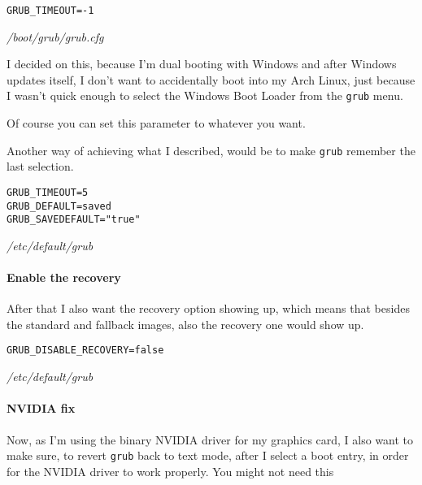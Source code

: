 \documentclass[10pt]{dustdoc}
\begin{document}
\begin{mintedlisting}
    \begin{verbatim}
GRUB_TIMEOUT=-1
    \end{verbatim}

    \caption{\textit{/boot/grub/grub.cfg}}
\end{mintedlisting}

\begin{NOTE}
    I decided on this, because I’m dual booting with Windows and after Windows updates itself, I don’t want to accidentally boot into my Arch Linux, just because I wasn’t quick enough to select the Windows Boot Loader from the \texttt{grub} menu.

    Of course you can set this parameter to whatever you want.

    Another way of achieving what I described, would be to make \texttt{grub} remember the last selection.

    \begin{mintedlisting}
        \begin{verbatim}
GRUB_TIMEOUT=5
GRUB_DEFAULT=saved
GRUB_SAVEDEFAULT="true"
        \end{verbatim}

        \caption{\textit{/etc/default/grub}}
    \end{mintedlisting}
\end{NOTE}

\paragraph{Enable the recovery}
\label{par:enable-the-recovery}

After that I also want the recovery option showing up, which means that besides the standard and fallback images, also the recovery one would show up.

\begin{mintedlisting}
    \begin{verbatim}
GRUB_DISABLE_RECOVERY=false
    \end{verbatim}

    \caption{\textit{/etc/default/grub}}
\end{mintedlisting}

\paragraph{NVIDIA fix}
\label{par:nvidia-fix}

Now, as I’m using the binary NVIDIA driver for my graphics card, I also want to make sure, to revert \texttt{grub} back to text mode, after I select a boot entry, in order for the NVIDIA driver to work properly.
You might not need this
\end{document}
